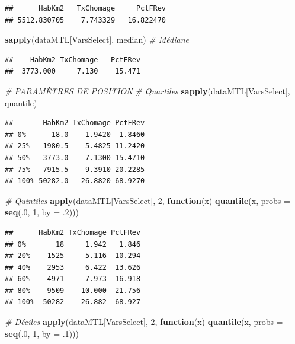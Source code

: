 \documentclass[
  11pt,
  french,
]{book}
\makeatletter
\newenvironment{Shaded}{\begin{snugshade}}{\end{snugshade}}
\newcommand{\CommentTok}[1]{\textcolor[rgb]{0.56,0.35,0.01}{\textit{#1}}}
\newcommand{\ControlFlowTok}[1]{\textcolor[rgb]{0.13,0.29,0.53}{\textbf{#1}}}
\newcommand{\DataTypeTok}[1]{\textcolor[rgb]{0.13,0.29,0.53}{#1}}
\newcommand{\DecValTok}[1]{\textcolor[rgb]{0.00,0.00,0.81}{#1}}
\newcommand{\FloatTok}[1]{\textcolor[rgb]{0.00,0.00,0.81}{#1}}
\newcommand{\KeywordTok}[1]{\textcolor[rgb]{0.13,0.29,0.53}{\textbf{#1}}}
\newcommand{\NormalTok}[1]{#1}
\newenvironment{kframe}{%
\medskip{}
\setlength{\fboxsep}{.8em}
 \def\at@end@of@kframe{}%
 \ifinner\ifhmode%
  \def\at@end@of@kframe{\end{minipage}}%
  \begin{minipage}{\columnwidth}%
 \fi\fi%
 \def\FrameCommand##1{\hskip\@totalleftmargin \hskip-\fboxsep
 \colorbox{shadecolor}{##1}\hskip-\fboxsep
     \hskip-\linewidth \hskip-\@totalleftmargin \hskip\columnwidth}%
 \MakeFramed {\advance\hsize-\width
   \@totalleftmargin\z@ \linewidth\hsize
   \@setminipage}}%
 {\par\unskip\endMakeFramed%
 \at@end@of@kframe}
\renewenvironment{Shaded}{\begin{kframe}}{\end{kframe}}
\makeatother
\begin{document}
\begin{verbatim}
##      HabKm2   TxChomage     PctFRev 
## 5512.830705    7.743329   16.822470
\end{verbatim}

\begin{Shaded}
\begin{Highlighting}[]
\KeywordTok{sapply}\NormalTok{(dataMTL[VarsSelect], median) }\CommentTok{# Médiane}
\end{Highlighting}
\end{Shaded}

\begin{verbatim}
##    HabKm2 TxChomage   PctFRev 
##  3773.000     7.130    15.471
\end{verbatim}

\begin{Shaded}
\begin{Highlighting}[]
\CommentTok{# PARAMÈTRES DE POSITION}
\CommentTok{# Quartiles}
\KeywordTok{sapply}\NormalTok{(dataMTL[VarsSelect], quantile)}
\end{Highlighting}
\end{Shaded}

\begin{verbatim}
##       HabKm2 TxChomage PctFRev
## 0%      18.0    1.9420  1.8460
## 25%   1980.5    5.4825 11.2420
## 50%   3773.0    7.1300 15.4710
## 75%   7915.5    9.3910 20.2285
## 100% 50282.0   26.8820 68.9270
\end{verbatim}

\begin{Shaded}
\begin{Highlighting}[]
\CommentTok{# Quintiles}
\KeywordTok{apply}\NormalTok{(dataMTL[VarsSelect], }\DecValTok{2}\NormalTok{, }\ControlFlowTok{function}\NormalTok{(x) }\KeywordTok{quantile}\NormalTok{(x, }\DataTypeTok{probs =} \KeywordTok{seq}\NormalTok{(.}\DecValTok{0}\NormalTok{, }\DecValTok{1}\NormalTok{, }\DataTypeTok{by =} \FloatTok{.2}\NormalTok{)))}
\end{Highlighting}
\end{Shaded}

\begin{verbatim}
##      HabKm2 TxChomage PctFRev
## 0%       18     1.942   1.846
## 20%    1525     5.116  10.294
## 40%    2953     6.422  13.626
## 60%    4971     7.973  16.918
## 80%    9509    10.000  21.756
## 100%  50282    26.882  68.927
\end{verbatim}

\begin{Shaded}
\begin{Highlighting}[]
\CommentTok{# Déciles}
\KeywordTok{apply}\NormalTok{(dataMTL[VarsSelect], }\DecValTok{2}\NormalTok{, }\ControlFlowTok{function}\NormalTok{(x) }\KeywordTok{quantile}\NormalTok{(x, }\DataTypeTok{probs =} \KeywordTok{seq}\NormalTok{(.}\DecValTok{0}\NormalTok{, }\DecValTok{1}\NormalTok{, }\DataTypeTok{by =} \FloatTok{.1}\NormalTok{)))}
\end{Highlighting}
\end{Shaded}
\end{document}
